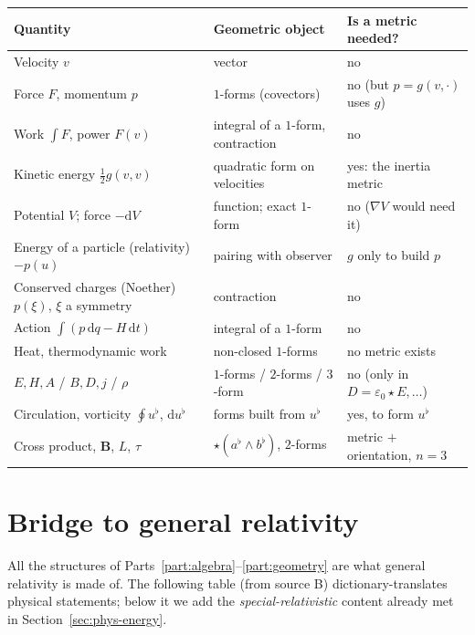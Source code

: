 \documentclass[11pt,a4paper]{article}
\renewcommand{\arraystretch}{1.25}
\numberwithin{equation}{section}
\theoremstyle{definition}
\theoremstyle{plain}
\newcommand{\dd}{\mathrm{d}}
\newcommand{\hodge}{\star}
\begin{document}
\begin{center}
\small
\renewcommand{\arraystretch}{1.3}
\begin{tabular}{@{}p{4.6cm}p{4.8cm}p{4.7cm}@{}}
\toprule
\textbf{Quantity} & \textbf{Geometric object} & \textbf{Is a metric needed?}\\
\midrule
Velocity $v$ & vector & no\\
Force $F$, momentum $p$ & $1$-forms (covectors) & no (but $p=g(v,\cdot)$ uses $g$)\\
Work $\int F$, power $F(v)$ & integral of a $1$-form, contraction & no\\
Kinetic energy $\frac12g(v,v)$ & quadratic form on velocities & yes: the inertia metric\\
Potential $V$; force $-\dd V$ & function; exact $1$-form & no ($\nabla V$ would need it)\\
Energy of a particle (relativity) $-p(u)$ & pairing with observer & $g$ only to build $p$\\
Conserved charges (Noether) $p(\xi)$, $\xi$ a symmetry & contraction & no\\
Action $\int(p\,\dd q-H\,\dd t)$ & integral of a $1$-form & no\\
Heat, thermodynamic work & non-closed $1$-forms & no metric exists\\
$E,H,A$ / $B,D,j$ / $\rho$ & $1$-forms / $2$-forms / $3$-form & no (only in $D=\varepsilon_0\hodge E,\dots$)\\
Circulation, vorticity $\oint u^\flat$, $\dd u^\flat$ & forms built from $u^\flat$ & yes, to form $u^\flat$\\
Cross product, $\mathbf B$, $L$, $\tau$ & $\hodge(a^\flat\wedge b^\flat)$, $2$-forms & metric $+$ orientation, $n=3$\\
\bottomrule
\end{tabular}
\end{center}

\section{Bridge to general relativity}\label{sec:bridge}

All the structures of Parts~\ref{part:algebra}--\ref{part:geometry} are what general relativity is made of. The following table (from source B) dictionary-translates physical statements; below it we add the
\emph{special-relativistic} content already met in Section~\ref{sec:phys-energy}.
\end{document}
